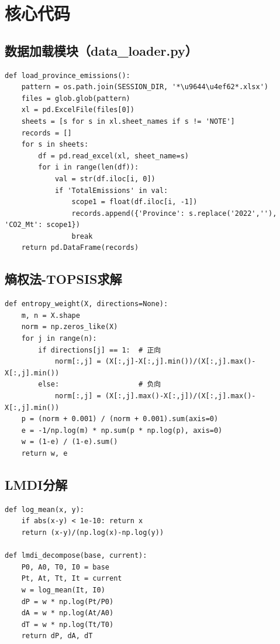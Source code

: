 \documentclass[12pt, a4paper]{article}
\begin{document}
\appendix
\section{核心代码}

\subsection{数据加载模块（data\_loader.py）}

\begin{lstlisting}[style=pythonstyle, caption={数据加载与共享模块}]
def load_province_emissions():
    pattern = os.path.join(SESSION_DIR, '*\u9644\u4ef62*.xlsx')
    files = glob.glob(pattern)
    xl = pd.ExcelFile(files[0])
    sheets = [s for s in xl.sheet_names if s != 'NOTE']
    records = []
    for s in sheets:
        df = pd.read_excel(xl, sheet_name=s)
        for i in range(len(df)):
            val = str(df.iloc[i, 0])
            if 'TotalEmissions' in val:
                scope1 = float(df.iloc[i, -1])
                records.append({'Province': s.replace('2022',''), 'CO2_Mt': scope1})
                break
    return pd.DataFrame(records)
\end{lstlisting}

\subsection{熵权法-TOPSIS求解}

\begin{lstlisting}[style=pythonstyle, caption={熵权法权重计算}]
def entropy_weight(X, directions=None):
    m, n = X.shape
    norm = np.zeros_like(X)
    for j in range(n):
        if directions[j] == 1:  # 正向
            norm[:,j] = (X[:,j]-X[:,j].min())/(X[:,j].max()-X[:,j].min())
        else:                   # 负向
            norm[:,j] = (X[:,j].max()-X[:,j])/(X[:,j].max()-X[:,j].min())
    p = (norm + 0.001) / (norm + 0.001).sum(axis=0)
    e = -1/np.log(m) * np.sum(p * np.log(p), axis=0)
    w = (1-e) / (1-e).sum()
    return w, e
\end{lstlisting}

\subsection{LMDI分解}

\begin{lstlisting}[style=pythonstyle, caption={LMDI因素分解}]
def log_mean(x, y):
    if abs(x-y) < 1e-10: return x
    return (x-y)/(np.log(x)-np.log(y))

def lmdi_decompose(base, current):
    P0, A0, T0, I0 = base
    Pt, At, Tt, It = current
    w = log_mean(It, I0)
    dP = w * np.log(Pt/P0)
    dA = w * np.log(At/A0)
    dT = w * np.log(Tt/T0)
    return dP, dA, dT
\end{lstlisting}
\end{document}
